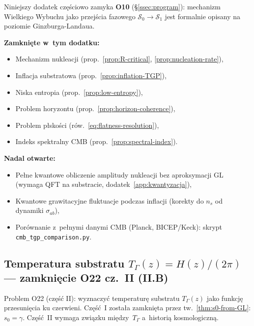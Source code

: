 \begin{remark}
Niniejszy dodatek cz\k{e}\'sciowo zamyka \textbf{O10}
(\S\ref{ssec:program}): mechanizm Wielkiego Wybuchu jako
przej\'scia fazowego $\mathcal{S}_0 \to \mathcal{S}_1$
jest formalnie opisany na poziomie Ginzburga-Landaua.

\textbf{Zamkni\k{e}te w~tym dodatku:}
\begin{itemize}[nosep]
  \item Mechanizm nukleacji (prop.~\ref{prop:R-critical},
        \ref{prop:nucleation-rate}),
  \item Inflacja substratowa (prop.~\ref{prop:inflation-TGP}),
  \item Niska entropia (prop.~\ref{prop:low-entropy}),
  \item Problem horyzontu (prop.~\ref{prop:horizon-coherence}),
  \item Problem p\l{}sko\'sci (r\'ow.~\ref{eq:flatness-resolution}),
  \item Indeks spektralny CMB (prop.~\ref{prop:spectral-index}).
\end{itemize}

\textbf{Nadal otwarte:}
\begin{itemize}[nosep]
  \item Pe\l{}ne kwantowe obliczenie amplitudy nukleacji
        bez aproksymacji GL (wymaga QFT na substracie,
        dodatek~\ref{app:kwantyzacja}),
  \item Kwantowe grawitacyjne fluktuacje podczas inflacji
        (korekty do $n_s$ od dynamiki $\sigma_{ab}$),
  \item Porównanie z~pe\l{}nymi danymi CMB (Planck, BICEP/Keck):
        skrypt \texttt{cmb\_tgp\_comparison.py}.
\end{itemize}
\end{remark}

\subsection{Temperatura substratu $T_\Gamma(z) = H(z)/(2\pi)$
  --- zamkni\k{e}cie O22 cz.~II (II.B)}%
\label{app:G-TGamma}

Problem O22 (cz\k{e}\'s\'c II): wyznaczy\'c temperatur\k{e} substratu
$T_\Gamma(z)$ jako funkcj\k{e} przesuni\k{e}cia ku czerwieni.
Cz\k{e}\'s\'c~I zosta\l{}a zamkni\k{e}ta przez
tw.~\ref{thm:s0-from-GL}: $s_0 = \gamma$.
Cz\k{e}\'s\'c~II wymaga zwi\k{a}zku mi\k{e}dzy~$T_\Gamma$
a~histori\k{a} kosmologiczn\k{a}.

